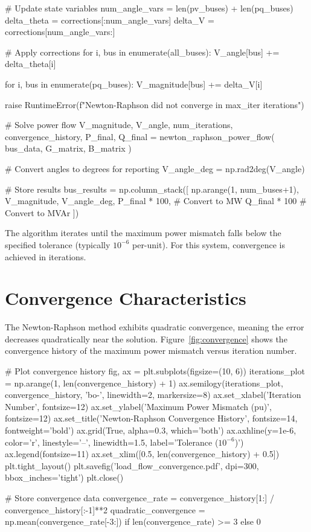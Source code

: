 \documentclass[11pt,a4paper]{article}
\begin{document}
\begin{pycode}
        # Update state variables
        num_angle_vars = len(pv_buses) + len(pq_buses)
        delta_theta = corrections[:num_angle_vars]
        delta_V = corrections[num_angle_vars:]

        # Apply corrections
        for i, bus in enumerate(all_buses):
            V_angle[bus] += delta_theta[i]

        for i, bus in enumerate(pq_buses):
            V_magnitude[bus] += delta_V[i]

    raise RuntimeError(f"Newton-Raphson did not converge in {max_iter} iterations")

# Solve power flow
V_magnitude, V_angle, num_iterations, convergence_history, P_final, Q_final = newton_raphson_power_flow(
    bus_data, G_matrix, B_matrix
)

# Convert angles to degrees for reporting
V_angle_deg = np.rad2deg(V_angle)

# Store results
bus_results = np.column_stack([
    np.arange(1, num_buses+1),
    V_magnitude,
    V_angle_deg,
    P_final * 100,  # Convert to MW
    Q_final * 100   # Convert to MVAr
])
\end{pycode}

The algorithm iterates until the maximum power mismatch falls below the specified tolerance (typically $10^{-6}$ per-unit). For this system, convergence is achieved in  iterations.

\section{Convergence Characteristics}

The Newton-Raphson method exhibits quadratic convergence, meaning the error decreases quadratically near the solution. Figure~\ref{fig:convergence} shows the convergence history of the maximum power mismatch versus iteration number.

\begin{pycode}
# Plot convergence history
fig, ax = plt.subplots(figsize=(10, 6))
iterations_plot = np.arange(1, len(convergence_history) + 1)
ax.semilogy(iterations_plot, convergence_history, 'bo-', linewidth=2, markersize=8)
ax.set_xlabel('Iteration Number', fontsize=12)
ax.set_ylabel('Maximum Power Mismatch (pu)', fontsize=12)
ax.set_title('Newton-Raphson Convergence History', fontsize=14, fontweight='bold')
ax.grid(True, alpha=0.3, which='both')
ax.axhline(y=1e-6, color='r', linestyle='--', linewidth=1.5, label='Tolerance ($10^{-6}$)')
ax.legend(fontsize=11)
ax.set_xlim([0.5, len(convergence_history) + 0.5])
plt.tight_layout()
plt.savefig('load_flow_convergence.pdf', dpi=300, bbox_inches='tight')
plt.close()

# Store convergence data
convergence_rate = convergence_history[1:] / convergence_history[:-1]**2
quadratic_convergence = np.mean(convergence_rate[-3:]) if len(convergence_rate) >= 3 else 0
\end{pycode}
\end{document}
